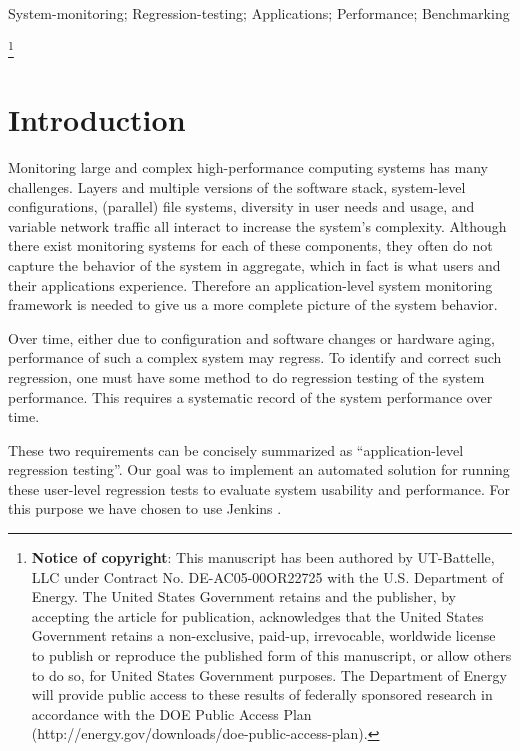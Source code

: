 \documentclass[10pt, conference, compsocconf]{IEEEtran}
\newcommand\blfootnote[1]{%
  \begingroup
  \renewcommand\thefootnote{}\footnote{#1}%
  \addtocounter{footnote}{-1}%
  \endgroup
}
\begin{document}
\begin{IEEEkeywords}
System-monitoring; Regression-testing; Applications; Performance; Benchmarking
\end{IEEEkeywords}

\blfootnote{\textbf{Notice of copyright}: This manuscript has been authored by UT-Battelle, LLC under Contract No. DE-AC05-00OR22725 with the U.S. Department of Energy. The United States Government retains and the publisher, by accepting the article for publication, acknowledges that the United States Government retains a non-exclusive, paid-up, irrevocable, worldwide license to publish or reproduce the published form of this manuscript, or allow others to do so, for United States Government purposes. The Department of Energy will provide public access to these results of federally sponsored research in accordance with the DOE Public Access Plan (http://energy.gov/downloads/doe-public-access-plan).}

\section{Introduction}
\label{sec:introduction}

Monitoring large and complex high-performance computing systems has many challenges. 
Layers and multiple versions of the software stack, system-level configurations, (parallel) file systems, diversity in user needs and usage, and variable network traffic all interact to increase the system's complexity. 
Although there exist monitoring systems for each of these components, they often do not capture the behavior of the system in aggregate, which in fact is what users and their applications experience. 
Therefore an application-level system monitoring framework is needed to give us a more complete picture of the system behavior. 
 

Over time, either due to configuration and software changes or hardware aging, performance of such a complex system may regress. 
To identify and correct such regression, one must have some method to do regression testing of the system performance. 
This requires a systematic record of the system performance over time.

These two requirements can be concisely summarized as ``application-level regression testing''. 
Our goal was to implement an automated solution for running these user-level regression tests to evaluate system usability and performance. 
For this purpose we have chosen to use Jenkins \cite{jenkins}.
\end{document}
